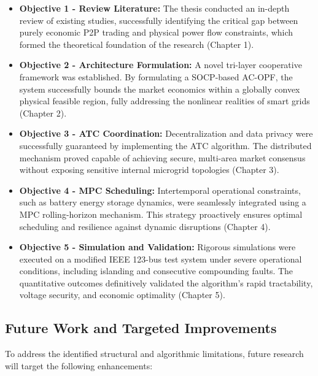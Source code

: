 \documentclass{thesis_1side}
\begin{document}
\begin{itemize}
    \item \textbf{Objective 1 - Review Literature:} The thesis conducted an in-depth review of existing studies, successfully identifying the critical gap between purely economic P2P trading and physical power flow constraints, which formed the theoretical foundation of the research (Chapter 1).
    \item \textbf{Objective 2 - Architecture Formulation:} A novel tri-layer cooperative framework was established. By formulating a SOCP-based AC-OPF, the system successfully bounds the market economics within a globally convex physical feasible region, fully addressing the nonlinear realities of smart grids (Chapter 2).
    \item \textbf{Objective 3 - ATC Coordination:} Decentralization and data privacy were successfully guaranteed by implementing the ATC algorithm. The distributed mechanism proved capable of achieving secure, multi-area market consensus without exposing sensitive internal microgrid topologies (Chapter 3).
    \item \textbf{Objective 4 - MPC Scheduling:} Intertemporal operational constraints, such as battery energy storage dynamics, were seamlessly integrated using a MPC rolling-horizon mechanism. This strategy proactively ensures optimal scheduling and resilience against dynamic disruptions (Chapter 4).
    \item \textbf{Objective 5 - Simulation and Validation:} Rigorous simulations were executed on a modified IEEE 123-bus test system under severe operational conditions, including islanding and consecutive compounding faults. The quantitative outcomes definitively validated the algorithm's rapid tractability, voltage security, and economic optimality (Chapter 5).
\end{itemize}

\subsection{Future Work and Targeted Improvements}

To address the identified structural and algorithmic limitations, future research will target the following enhancements:
\end{document}
